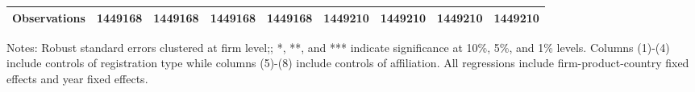 \documentclass[12pt]{article}
\begin{document}
\begin{table}
\begin{threeparttable}
\begin{tabular}{lcccccccc}
			Observations & 1449168 & 1449168 & 1449168 & 1449168 & 1449210 & 1449210 & 1449210 & 1449210\\
			\bottomrule
		\end{tabular}
		\begin{tablenotes}
			\footnotesize
			\item[Notes:] Robust standard errors clustered at firm level;; *, **, and *** indicate significance at 10\%, 5\%, and 1\% levels. Columns (1)-(4) include controls of registration type while columns (5)-(8) include controls of affiliation. All regressions include firm-product-country fixed effects and year fixed effects.
		\end{tablenotes}
	\end{threeparttable}
	\label{tab.robust.ownership}
\end{table}
\end{document}
